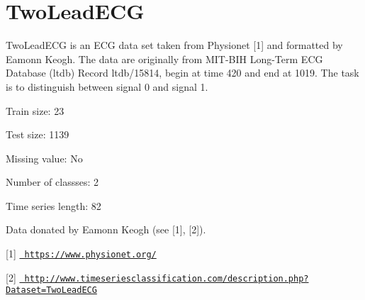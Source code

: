 \chapter{Two\+Lead\+ECG}
\hypertarget{md_external_2data_2UCRArchive__2018_2TwoLeadECG_2README}{}\label{md_external_2data_2UCRArchive__2018_2TwoLeadECG_2README}
\label{md_external_2data_2UCRArchive__2018_2TwoLeadECG_2README_autotoc_md222}%
%
 Two\+Lead\+ECG is an ECG data set taken from Physionet \mbox{[}1\mbox{]} and formatted by Eamonn Keogh. The data are originally from MIT-\/\+BIH Long-\/\+Term ECG Database (ltdb) Record ltdb/15814, begin at time 420 and end at 1019. The task is to distinguish between signal 0 and signal 1.

Train size\+: 23

Test size\+: 1139

Missing value\+: No

Number of classses\+: 2

Time series length\+: 82

Data donated by Eamonn Keogh (see \mbox{[}1\mbox{]}, \mbox{[}2\mbox{]}).

\mbox{[}1\mbox{]} \href{https://www.physionet.org/}{\texttt{ https\+://www.\+physionet.\+org/}}

\mbox{[}2\mbox{]} \href{http://www.timeseriesclassification.com/description.php?Dataset=TwoLeadECG}{\texttt{ http\+://www.\+timeseriesclassification.\+com/description.\+php?\+Dataset=\+Two\+Lead\+ECG}} 